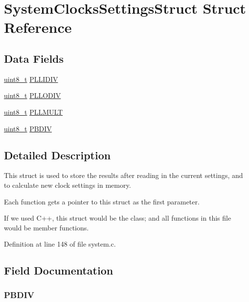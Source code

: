 \hypertarget{struct_system_clocks_settings_struct}{\section{System\-Clocks\-Settings\-Struct Struct Reference}
\label{struct_system_clocks_settings_struct}
}
\subsection*{Data Fields}
\begin{DoxyCompactItemize}
\item 
\hyperlink{p32_2include_2pinguino_2core_2typedef_8h_aba7bc1797add20fe3efdf37ced1182c5}{uint8\-\_\-t} \hyperlink{struct_system_clocks_settings_struct_ae88334ac2f0e997b8360489ee41d830d}{P\-L\-L\-I\-D\-I\-V}
\item 
\hyperlink{p32_2include_2pinguino_2core_2typedef_8h_aba7bc1797add20fe3efdf37ced1182c5}{uint8\-\_\-t} \hyperlink{struct_system_clocks_settings_struct_a281ef8423a7e781fdb715ba7dca8df4f}{P\-L\-L\-O\-D\-I\-V}
\item 
\hyperlink{p32_2include_2pinguino_2core_2typedef_8h_aba7bc1797add20fe3efdf37ced1182c5}{uint8\-\_\-t} \hyperlink{struct_system_clocks_settings_struct_ab765b0bda56d0b80ed00487dbe6fd3ad}{P\-L\-L\-M\-U\-L\-T}
\item 
\hyperlink{p32_2include_2pinguino_2core_2typedef_8h_aba7bc1797add20fe3efdf37ced1182c5}{uint8\-\_\-t} \hyperlink{struct_system_clocks_settings_struct_ae29dea6ccff6f071be02bdfdc1048617}{P\-B\-D\-I\-V}
\end{DoxyCompactItemize}


\subsection{Detailed Description}
This struct is used to store the results after reading in the current settings, and to calculate new clock settings in memory.

Each function gets a pointer to this struct as the first parameter.

If we used C++, this struct would be the class; and all functions in this file would be member functions. 

Definition at line 148 of file system.\-c.



\subsection{Field Documentation}
\hypertarget{struct_system_clocks_settings_struct_ae29dea6ccff6f071be02bdfdc1048617}{
\subsubsection[{P\-B\-D\-I\-V}]{ P\-B\-D\-I\-V}}\label{struct_system_clocks_settings_struct_ae29dea6ccff6f071be02bdfdc1048617}


